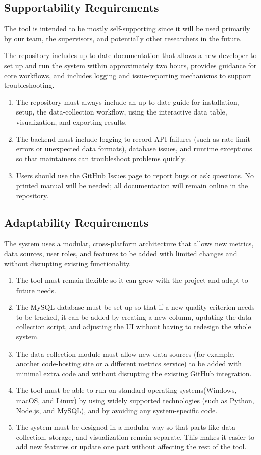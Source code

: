 \documentclass[12pt]{article}
\begin{document}
\subsection{Supportability Requirements}
The tool is intended to be mostly self-supporting since it will be used primarily by our team, the supervisors, and potentially other researchers in the future.

The repository includes up-to-date documentation that allows a new developer to set up and run the system within approximately two hours, provides guidance for core workflows, and includes logging and issue-reporting mechanisms to support troubleshooting.
\begin{enumerate}[label=MS-SR\arabic*]
\item The repository must always include an up-to-date guide for installation, setup, the data-collection workflow, using the interactive data table, visualization, and exporting results.
\item The backend must include logging to record API failures (such as rate-limit errors or unexpected data formats), database issues, and runtime exceptions so that maintainers can troubleshoot problems quickly.
\item Users should use the GitHub Issues page to report bugs or ask questions. No printed manual will be needed; all documentation will remain online in the repository.
\end{enumerate}
\subsection{Adaptability Requirements}
The system uses a modular, cross-platform architecture that allows new metrics, data sources, user roles, and features to be added with limited changes and without disrupting existing functionality.
\begin{enumerate}[label=MS-AR\arabic*]
\item The tool must remain flexible so it can grow with the project and adapt to future needs.
\item The MySQL database must be set up so that if a new quality criterion needs to be tracked, it can be added by creating a new column, updating the data-collection script, and adjusting the UI without having to redesign the whole system.
\item The data-collection module must allow new data sources (for example, another code-hosting site or a different metrics service) to be added with minimal extra code and without disrupting the existing GitHub integration.
\item The tool must be able to run on standard operating systems(Windows, macOS, and Linux) by using widely supported technologies (such as Python, Node.js, and MySQL), and by avoiding any system-specific code.
\item The system must be designed in a modular way so that parts like data collection, storage, and visualization remain separate. This makes it easier to add new features or update one part without affecting the rest of the tool.
\end{enumerate}
\end{document}
